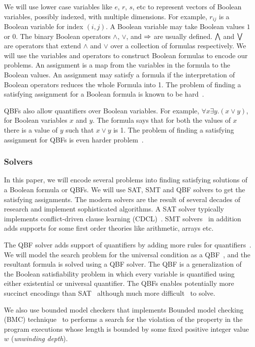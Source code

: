 \noindent We will use lower case variables like $e$, $r$, $s$, etc to represent vectors of
Boolean variables, possibly indexed, with multiple dimensions.
%
For example, $r_{ij}$ is a Boolean variable for index $(i,j)$.
%
%
A Boolean variable may take Boolean values $1$ or $0$.
%
The binary Boolean operators $\land$, $\lor$, and $\Rightarrow$ are usually defined.
%
$\bigwedge$ and $\bigvee$ are operators that extend $\land$ and $\lor$ over a collection of formulas respectively.
%
We will use the variables and operators to construct Boolean formulas to
encode our problems.
%
An assignment is a map from the variables in the formula to the Boolean values.
%
An assignment may satisfy a formula if the interpretation of Boolean operators
reduces the whole Formula into 1.
%
The problem of finding a satisfying assignment for a Boolean formula is known to be hard~\cite{cook1971complexity}.
%

QBFs also allow quantifiers over Boolean variables.
%
For example, $\forall x \exists y. (x \lor y)$, for Boolean variables $x$ and $y$.
%
The formula says that for both the values of $x$ there is a value of $y$
such that $x \lor y$ is 1.
%
The problem of finding a satisfying assignment for QBFs is even harder problem~\cite{savitch1970relationships, stockmeyer1973word}.
%

\subsubsection{Solvers}
In this paper, we will encode several problems into finding satisfying solutions of a Boolean formula or QBFs.
%
We will use SAT, SMT and QBF solvers to get the satisfying assignments.
%
The modern solvers are the result of several decades of research
and implement sophisticated algorithms.
%
%
A SAT solver typically implements conflict-driven clause learning (CDCL)~\cite{biere2009conflict}.
SMT solvers~\cite{nieuwenhuis2006solving, barrett2018satisfiability} in addition adds supports for some first order theories like arithmetic, arrays etc.
% 

The QBF solver adds support of quantifiers by adding more rules for quantifiers~\cite{buning2009theory}.
%
We will model the search problem for the universal condition as a QBF~\cite{buning2009theory, benedetti2008qbf}, and the resultant formula is solved using a QBF solver.
%
The QBF is a generalization of the Boolean satisfiability problem in which every variable is quantified using either existential or universal quantifier.
%
The QBFs enables potentially more succinct encodings than SAT~\cite{jussila2007compressing} although much more difficult~\cite{savitch1970relationships, stockmeyer1973word} to solve.

We also use bounded model checkers that implements Bounded model checking (BMC) technique~\cite{biere1999symbolic1, biere2003bounded} to performs a search for the violation of the property in the program executions whose length is bounded by some fixed positive integer value $w$ (\textit{unwinding depth}). 
%
%

